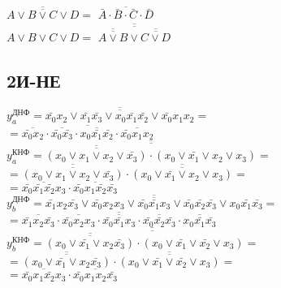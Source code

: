 \documentclass{bmstu}
\begin{document}
	\begin{center}
		$\overline{\overline{A \vee B \vee C \vee D}} =$
		$\overline{\bar{A} \cdot \bar{B} \cdot \bar{C} \cdot \bar{D}}$ \\
		$A \vee B \vee C \vee D =$
		$\overline{\overline{
				   \overline{\overline{A \vee B}} \vee
				   \overline{\overline{C \vee D}}
				}}$
	\end{center}

	\newpage

	\subsection{2И-НЕ}	
	$y^{\text{ДНФ}}_a = \overline{\overline{\bar{x_0} x_2 \vee \bar{x_1} \bar{x_3} \vee x_0 \bar{x_1} \bar{x_2} \vee \bar{x_0} x_1 x_2}} =$ \\
	$= \overline{\overline{\bar{x_0} x_2} \cdot \overline{\bar{x_0} \bar{x_3}} \cdot \overline{x_0 \bar{x_1} \bar{x_2}} \cdot \overline{\bar{x_0} x_1 x_2}}$ \\
	$y^{\text{КНФ}}_a = \overline{\overline{\overline{\overline{(x_0 \vee x_1 \vee x_2 \vee \bar{x_3})}} \cdot (x_0 \vee \bar{x_1} \vee x_2 \vee x_3)}} = $ \\
	$= \overline{\overline{(x_0 \vee x_1 \vee x_2 \vee \bar{x_3})}} \cdot \overline{\overline{(x_0 \vee \bar{x_1} \vee x_2 \vee x_3)}} = $ \\
	$= \overline{\bar{x_0} \bar{x_1} \bar{x_2} x_3} \cdot \overline{\bar{x_0} x_1 \bar{x_2} \bar{x_3}}$ \\
	
	$y^{\text{ДНФ}}_b = \overline{\overline{\bar{x_1} x_2 \bar{x_3} \vee \bar{x_0} x_2 x_3 \vee \bar{x_0} \bar{x_1} x_3 \vee \bar{x_0} \bar{x_2} \bar{x_3} \vee x_0 \bar{x_1} \bar{x_3}}} = $ \\
	$= \overline{\overline{\bar{x_1} x_2 \bar{x_3}} \cdot\overline{\bar{x_0} x_2 x_3} \cdot\overline{\bar{x_0} \bar{x_1} x_3} \cdot\overline{\bar{x_0} \bar{x_2} \bar{x_3}} \cdot \overline{x_0 \bar{x_1} \bar{x_3}}}$ \\
	$y^{\text{КНФ}}_b = \overline{\overline{\overline{\overline{(x_0 \vee \bar{x_1} \vee x_2 \bar{x_3})}} \cdot(x_0 \vee \bar{x_1} \vee \bar{x_2} \vee x_3) =}}$ \\
	$= \overline{\overline{(x_0 \vee \bar{x_1} \vee x_2 \bar{x_3})}} \cdot\overline{\overline{(x_0 \vee \bar{x_1} \vee \bar{x_2} \vee x_3)}} =$ \\
	$= \overline{\bar{x_0} x_1 \bar{x_2} x_3} \cdot \overline{\bar{x_0} x_1 x_2 \bar{x_3}}$ \\
	
\end{document}
